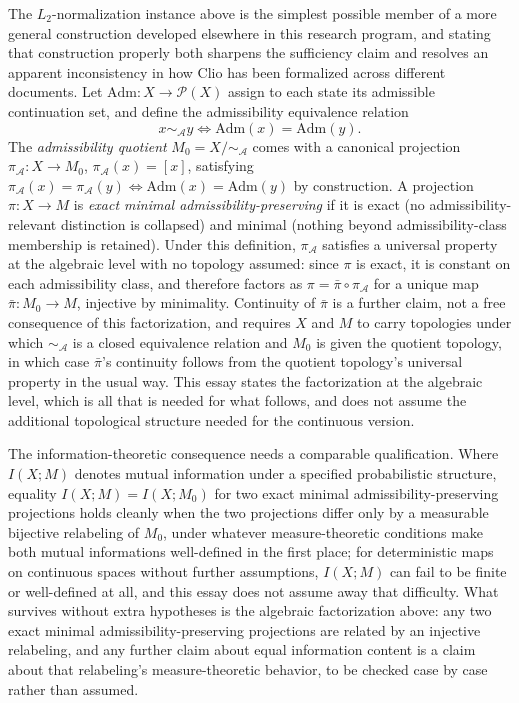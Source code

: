 \documentclass[11pt]{article}
\begin{document}
The $L_2$-normalization instance above is the simplest possible member of a more general construction developed elsewhere in this research program, and stating that construction properly both sharpens the sufficiency claim and resolves an apparent inconsistency in how Clio has been formalized across different documents. Let $\mathrm{Adm}: X \to \mathcal{P}(X)$ assign to each state its admissible continuation set, and define the admissibility equivalence relation
\[
x \sim_{\mathcal{A}} y \iff \mathrm{Adm}(x) = \mathrm{Adm}(y).
\]
The \emph{admissibility quotient} $M_0 = X / {\sim_{\mathcal{A}}}$ comes with a canonical projection $\pi_{\mathcal{A}}: X \to M_0$, $\pi_{\mathcal{A}}(x) = [x]$, satisfying $\pi_{\mathcal{A}}(x) = \pi_{\mathcal{A}}(y) \iff \mathrm{Adm}(x) = \mathrm{Adm}(y)$ by construction. A projection $\pi: X \to M$ is \emph{exact minimal admissibility-preserving} if it is exact (no admissibility-relevant distinction is collapsed) and minimal (nothing beyond admissibility-class membership is retained). Under this definition, $\pi_{\mathcal{A}}$ satisfies a universal property at the algebraic level with no topology assumed: since $\pi$ is exact, it is constant on each admissibility class, and therefore factors as $\pi = \bar{\pi} \circ \pi_{\mathcal{A}}$ for a unique map $\bar{\pi}: M_0 \to M$, injective by minimality. Continuity of $\bar{\pi}$ is a further claim, not a free consequence of this factorization, and requires $X$ and $M$ to carry topologies under which $\sim_{\mathcal{A}}$ is a closed equivalence relation and $M_0$ is given the quotient topology, in which case $\bar\pi$'s continuity follows from the quotient topology's universal property in the usual way. This essay states the factorization at the algebraic level, which is all that is needed for what follows, and does not assume the additional topological structure needed for the continuous version.

The information-theoretic consequence needs a comparable qualification. Where $I(X;M)$ denotes mutual information under a specified probabilistic structure, equality $I(X;M) = I(X;M_0)$ for two exact minimal admissibility-preserving projections holds cleanly when the two projections differ only by a measurable bijective relabeling of $M_0$, under whatever measure-theoretic conditions make both mutual informations well-defined in the first place; for deterministic maps on continuous spaces without further assumptions, $I(X;M)$ can fail to be finite or well-defined at all, and this essay does not assume away that difficulty. What survives without extra hypotheses is the algebraic factorization above: any two exact minimal admissibility-preserving projections are related by an injective relabeling, and any further claim about equal information content is a claim about that relabeling's measure-theoretic behavior, to be checked case by case rather than assumed.
\end{document}

